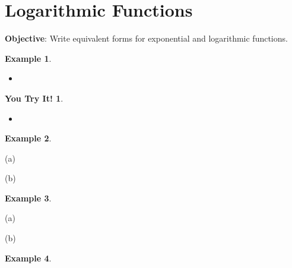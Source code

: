 \documentclass{report}
\theoremstyle{definition}
\newtheorem{example}{\bf Example}
\newtheorem{youtry}{\bf You Try It!}
\begin{document}
\vfill
\noindent{}
 
 \newpage

 \section{ Logarithmic Functions  }
  \indent\hfill\small\noindent \textbf{Objective}: Write equivalent forms for exponential and logarithmic functions. \normalsize\\
 \setcounter{example}{0}
 \setcounter{definition}{0}
 
\hspace{-0.5cm}\begin{minipage}[t]{0.45\linewidth}
	 \begin{example}

	 \end{example}
	 \begin{itemize}
	 	\item[(a)] 
	 \end{itemize}
\end{minipage}
\hspace{1.25cm}
 \begin{minipage}[t]{0.45\linewidth}
 	 \begin{youtry}

 	 \end{youtry}
	 \begin{itemize}
	 	\item[(b)]
	 \end{itemize}
\end{minipage}
 \vfill
 \begin{example}

 \end{example}
 
\begin{minipage}[t]{0.45\linewidth}
(a) 
\end{minipage}
 \hfill
 \begin{minipage}[t]{0.45\linewidth}
(b) 
\end{minipage}
\vfill
 \vfill
 
 \begin{example}

 \end{example}
\begin{minipage}[t]{0.45\linewidth}
(a) 
\end{minipage}
 \hfill
\begin{minipage}[t]{0.45\linewidth}
(b) 
\end{minipage}
\vfill
\begin{example}

\end{example}
\end{document}
